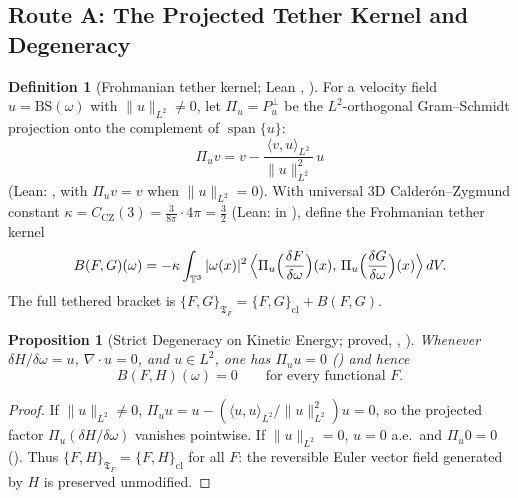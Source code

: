 \documentclass[11pt,a4paper]{article}
\theoremstyle{plain}
\newtheorem{proposition}{Proposition}[section]
\theoremstyle{definition}
\newtheorem{definition}{Definition}[section]
\theoremstyle{remark}
\newcommand{\T}{\mathbb{T}^3}
\newcommand{\Tf}{\mathfrak{T}_F}
\newcommand{\CZ}{C_{\mathrm{CZ}}}
\begin{document}
\subsection{Route A: The Projected Tether Kernel and Degeneracy}
\begin{definition}[Frohmanian tether kernel; Lean , ]\label{def:tether}
For a velocity field $u=\mathrm{BS}(\omega)$ with $\|u\|_{L^2}\neq0$, let $\Pi_u=P^\perp_u$ be the $L^2$-orthogonal Gram--Schmidt projection onto the complement of $\operatorname{span}\{u\}$:
\[
\Pi_u v=v-\frac{\langle v,u\rangle_{L^2}}{\|u\|_{L^2}^2}\,u
\]
(Lean: , with $\Pi_u v=v$ when $\|u\|_{L^2}=0$). With universal 3D Calderón--Zygmund constant $\kappa=\CZ(3)=\frac{3}{8\pi}\cdot 4\pi=\frac{3}{2}$ (Lean:  in ), define the Frohmanian tether kernel
\[
B(F,G)(\omega)=-\kappa\int_{\T}|\omega(x)|^2\,\Bigl\langle \Pi_u\Bigl(\frac{\delta F}{\delta\omega}\Bigr)(x),\,\Pi_u\Bigl(\frac{\delta G}{\delta\omega}\Bigr)(x)\Bigr\rangle\,dV .
\]
The full tethered bracket is $\{F,G\}_{\Tf}=\{F,G\}_{\mathrm{cl}}+B(F,G)$.
\end{definition}

\begin{proposition}[Strict Degeneracy on Kinetic Energy; proved, , ]\label{prop:degen}
Whenever $\delta H/\delta\omega=u$, $\nabla\cdot u=0$, and $u\in L^2$, one has $\Pi_u u=0$ () and hence
\[
B(F,H)(\omega)=0\qquad\text{for every functional }F.
\]
\end{proposition}
\begin{proof}
If $\|u\|_{L^2}\ne0$, $\Pi_u u=u-(\langle u,u\rangle_{L^2}/\|u\|_{L^2}^2)u=0$, so the projected factor $\Pi_u(\delta H/\delta\omega)$ vanishes pointwise. If $\|u\|_{L^2}=0$, $u=0$ a.e.\ and $\Pi_u 0=0$ (). Thus $\{F,H\}_{\Tf}=\{F,H\}_{\mathrm{cl}}$ for all $F$: the reversible Euler vector field generated by $H$ is preserved unmodified.
\end{proof}
\end{document}
